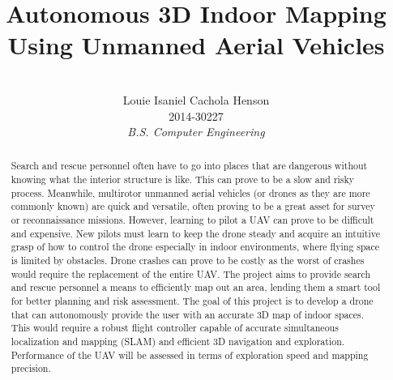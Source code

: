 \documentclass[english]{upeeei}
\begin{document}
\title{Autonomous 3D Indoor Mapping Using Unmanned Aerial Vehicles} 


\author{
\\Louie Isaniel Cachola Henson \\ 2014-30227 \\ \emph{B.S. Computer Engineering}
}




\maketitle
\begin{abstract} 

Search and rescue personnel often have to go into places that are dangerous without knowing what the interior
structure is like. This can prove to be a slow and risky process. Meanwhile,
multirotor unmanned aerial vehicles (or drones as they are more commonly known) are quick and versatile, often 
proving to be a great asset for survey or reconnaissance missions.
However, learning to pilot a UAV can prove to be 
difficult and expensive. New pilots must learn to keep the drone steady and acquire an intuitive grasp of how to
control the drone especially in indoor environments, where flying space is limited by obstacles. Drone crashes
can prove to be costly as the worst of crashes would require the replacement of the entire UAV.
The project aims to provide search and rescue
personnel a means to efficiently map out an area, lending them a smart tool for better planning and risk assessment.
The goal of this project is to develop a drone that can autonomously provide the user with an
accurate 3D map of indoor spaces. This would require a robust flight controller capable of
accurate simultaneous localization and mapping (SLAM) and efficient 3D navigation and exploration. Performance of the UAV
will be assessed in terms of exploration speed and mapping precision.

\end{abstract}
\end{document}
